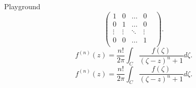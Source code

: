 \documentclass[class=article, crop=false]{standalone}
\begin{document}
\begin{zettel}{Playground}
\[
	\begin{pmatrix}
		1      & 0      & \dots  & 0        \\
		0      & 1      & \dots  & 0        \\
		\vdots & \vdots & \ddots & \vdots & \\
		0      & 0      & \dots  & 1        \\
	\end{pmatrix}
	.
\]
\[
	f ^{(n)}(z) =  \frac{n!}{2 \pi } \int_{C}^{} \frac{f (\zeta)}{(\zeta-z)^n+1 } d \zeta
	.
\]
\[
	f ^{(n)}(z) = \frac{n!}{2\pi} \int_{C}^{} \frac{f(\zeta)}{(\zeta - z)^n + 1} d \zeta
.\]


\end{zettel}
\end{document}
